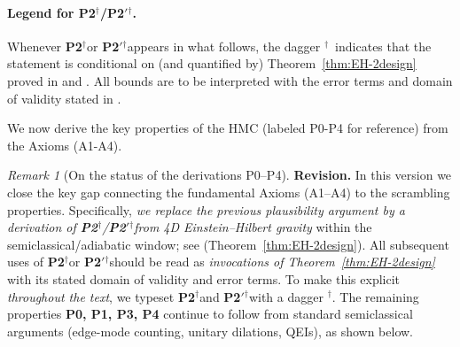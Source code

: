 \documentclass[a4paper,11pt]{article}
\newcommand{\condmark}{\ensuremath{^{\dagger}}}
\newcommand{\Ptwo}{\textbf{P2}\condmark}
\newcommand{\PtwoPrime}{\textbf{P2$'$}\condmark}
\newcommand{\HMC}{\textsc{HMC}\xspace}
\theoremstyle{plain}
\theoremstyle{definition}
\theoremstyle{remark}
\newtheorem{remark}{Remark}
\begin{document}
\paragraph{Legend for \Ptwo/\PtwoPrime.}
Whenever \Ptwo or \PtwoPrime appears in what follows, the dagger \condmark\ indicates that the statement is conditional on (and quantified by) Theorem~\ref{thm:EH-2design} proved in  and .
All bounds are to be interpreted with the error terms and domain of validity stated in .

\label{sec:derivations_postulates}

\noindent
We now derive the key properties of the \HMC{} (labeled P0-P4 for reference) from the Axioms (A1-A4).


\begin{remark}[On the status of the derivations P0--P4]
\label{rem:status-derivations}
\textbf{Revision.} In this version we close the key gap connecting the fundamental Axioms (A1--A4) to the scrambling properties. 
Specifically, \emph{we replace the previous plausibility argument by a derivation of \Ptwo/\PtwoPrime from 4D Einstein--Hilbert gravity}
within the semiclassical/adiabatic window; see  (Theorem~\ref{thm:EH-2design}).
All subsequent uses of \Ptwo or \PtwoPrime should be read as \emph{invocations of Theorem~\ref{thm:EH-2design}} with its stated domain of validity and error terms. 
To make this explicit \emph{throughout the text}, we typeset \Ptwo and \PtwoPrime with a dagger \condmark. 
The remaining properties \textbf{P0, P1, P3, P4} continue to follow from standard semiclassical arguments (edge-mode counting, unitary dilations, QEIs), as shown below.
\end{remark}
\end{document}
